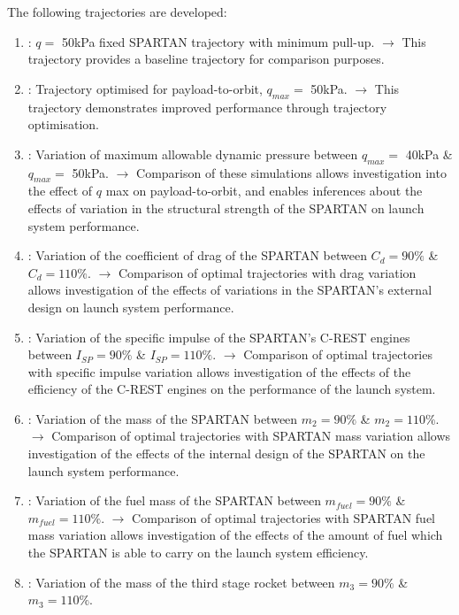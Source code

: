 The following trajectories are developed: 
\begin{enumerate}
	\item: $q = $ 50kPa fixed SPARTAN trajectory with minimum pull-up. \newline$\rightarrow$ This trajectory provides a baseline trajectory for comparison purposes.
	\item: Trajectory optimised for payload-to-orbit, $q_{max} = $ 50kPa. \newline$\rightarrow$ This trajectory demonstrates improved performance through trajectory optimisation.
	\item: Variation of maximum allowable dynamic pressure between $q_{max} = $ 40kPa \& $q_{max} = $ 50kPa. 
	\newline$\rightarrow$ Comparison of these simulations allows investigation into the effect of $q$ max on payload-to-orbit, and enables inferences about the effects of variation in the structural strength of the SPARTAN on launch system performance.
	\item: Variation of the coefficient of drag of the SPARTAN between $C_d = 90\%$ \& $C_d = 110\%$. 
	\newline$\rightarrow$ Comparison of optimal trajectories with drag variation allows investigation of the effects of variations in the SPARTAN's external design on launch system performance.
	\item: Variation of the specific impulse of the SPARTAN's C-REST engines between $I_{SP} = 90\%$ \& $I_{SP} = 110\%$. 
	\newline$\rightarrow$ Comparison of optimal trajectories with specific impulse variation allows investigation of the effects of the efficiency of the C-REST engines on the performance of the launch system. 
	\item: Variation of the mass of the SPARTAN between $m_2 = 90\%$ \& $m_2 = 110\%$. 
	\newline$\rightarrow$ Comparison of optimal trajectories with SPARTAN mass variation allows investigation of the effects of the internal design of the SPARTAN on the launch system performance. 
	\item: Variation of the fuel mass of the SPARTAN between $m_{fuel} = 90\%$ \& $m_{fuel} = 110\%$. 
	\newline$\rightarrow$ Comparison of optimal trajectories with SPARTAN fuel mass variation allows investigation of the effects of the amount of fuel which the SPARTAN is able to carry on the launch system efficiency. 
	\item: Variation of the mass of the third stage rocket between $m_3 = 90\%$ \& $m_3 = 110\%$. 

\end{enumerate}
